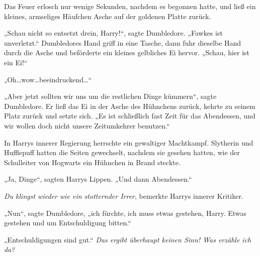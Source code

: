 Das Feuer erlosch nur wenige Sekunden, nachdem es begonnen hatte, und ließ ein kleines, armseliges Häufchen Asche auf der goldenen Platte zurück.

„Schau nicht so entsetzt drein, Harry!“, sagte Dumbledore. „Fawkes ist unverletzt.“ Dumbledores Hand griff in eine Tasche, dann fuhr dieselbe Hand durch die Asche und beförderte ein kleines gelbliches Ei hervor. „Schau, hier ist ein Ei!“

„Oh…wow…beeindruckend…“

„Aber jetzt sollten wir uns um die restlichen Dinge kümmern“, sagte Dumbledore. Er ließ das Ei in der Asche des Hühnchens zurück, kehrte zu seinem Platz zurück und setzte sich. „Es ist schließlich fast Zeit für das Abendessen, und wir wollen doch nicht unsere Zeitumkehrer benutzen.“

In Harrys innerer Regierung herrschte ein gewaltiger Machtkampf. Slytherin und Hufflepuff hatten die Seiten gewechselt, nachdem sie gesehen hatten, wie der Schulleiter von Hogwarts ein Hühnchen in Brand steckte.

„Ja, Dinge“, sagten Harrys Lippen. „Und dann Abendessen.“

\emph{Du klingst wieder wie ein stotternder Irrer}, bemerkte Harrys innerer Kritiker.

„Nun“, sagte Dumbledore, „ich fürchte, ich muss etwas gestehen, Harry. Etwas gestehen und um Entschuldigung bitten.“

„Entschuldigungen sind gut.“ \emph{Das ergibt überhaupt keinen Sinn! Was erzähle ich da?}

